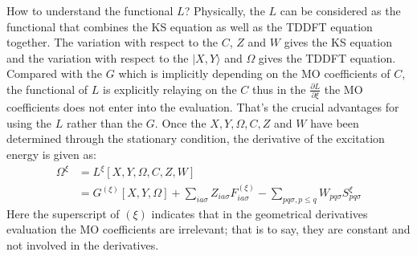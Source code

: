 How to understand the functional $L$? Physically, the $L$ can be
considered as the functional that combines the KS equation as well
as the TDDFT equation together. The variation with respect to the
$C$, $Z$ and $W$ gives the KS equation and the variation with
respect to the $|X,Y\rangle$ and $\Omega$ gives the TDDFT equation.
Compared with the $G$ which is implicitly depending on the MO
coefficients of $C$, the functional of $L$ is explicitly relaying on
the $C$ thus in the $\frac{\partial L}{\partial \xi}$ the MO
coefficients does not enter into the evaluation. That's the crucial
advantages for using the $L$ rather than the $G$. Once the $X, Y,
\Omega, C, Z$ and $W$ have been determined through the stationary
condition, the derivative of the excitation energy is given as:
\begin{align}\label{}
\Omega^{\xi} &= L^{\xi}[X, Y, \Omega, C, Z ,W] \nonumber \\
&=G^{(\xi)}[X, Y, \Omega] +
\sum_{ia\sigma}Z_{ia\sigma}F^{(\xi)}_{ia\sigma} - \sum_{pq\sigma,
p\leq q}W_{pq\sigma}S^{\xi}_{pq\sigma}
\end{align}
Here the superscript of $(\xi)$ indicates that in the geometrical
derivatives evaluation the MO coefficients are irrelevant; that is
to say, they are constant and not involved in the derivatives.







